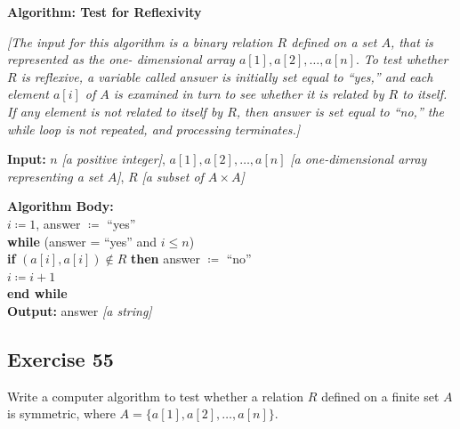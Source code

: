 \documentclass[14pt]{extarticle}
\newcommand{\cy}{\color{cyan}}
\begin{document}
\begin{tcolorbox}[colframe=cyan]
        {\bf \cy Algorithm: Test for Reflexivity}

        {\it [The input for this algorithm is a binary relation $R$ defined on a set $A$, that is represented as the one-
                        dimensional array \(a[1], a[2], \ldots, a[n].\) To test whether $R$ is reflexive, a variable called answer is
                        initially set equal to “yes,” and each element \(a[i]\) of $A$ is examined in turn to see whether it is related by $R$
                        to itself. If any element is not related to itself by $R$, then answer is set equal to “no,” the while loop is not
                        repeated, and processing terminates.]}
\end{tcolorbox}

\begin{tcolorbox}[colframe=cyan]
        {\bf Input:} $n$ {\it [a positive integer]}, \(a[1], a[2], \ldots, a[n]\) {\it [a one-dimensional array representing a set $A$]}, $R$ {\it [a subset of \(A \times A\)]}

        \begin{tabbing}
                {\bf Alg}\={\bf orithm Body:} \\
                \> \(i \coloneqq 1\), answer $\coloneqq$ ``yes''\\
                \> {\bf whi}\={\bf le} (answer = ``yes'' and \(i \leq n\)) \\
                \>          \> {\bf if} \((a[i], a[i]) \notin R\) {\bf then} answer \(\coloneqq\) ``no'' \\
                \>          \>  \(i \coloneqq i+1\) \\
                \> {\bf end while} \\
                {\bf Output:} answer {\it [a string]}
        \end{tabbing}
\end{tcolorbox}

\subsection{Exercise 55}
Write a computer algorithm to test whether a relation \(R\) defined on a finite set \(A\) is symmetric, where
\(A = \{a[1], a[2], \ldots, a[n]\}\).
\end{document}
